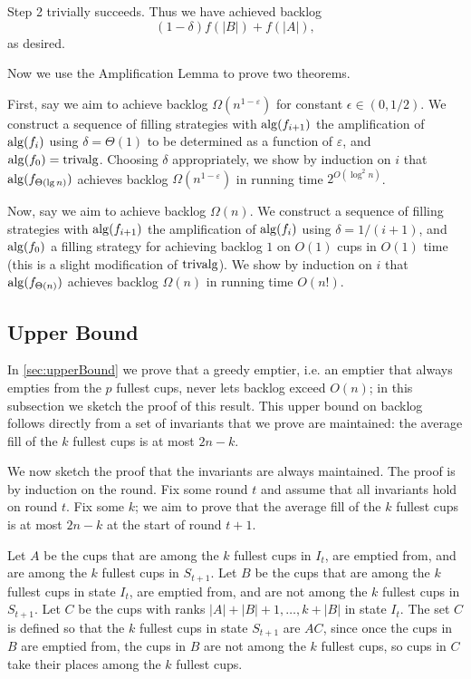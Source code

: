 Step 2 trivially succeeds.
Thus we have achieved backlog
$$(1-\delta) f(|B|) + f(|A|), $$
as desired.

Now we use the Amplification Lemma to prove two theorems.

First, say we aim to achieve backlog $\Omega(n^{1-\varepsilon})$
for constant $\epsilon \in (0, 1/2)$. We construct a sequence of
filling strategies with $\operatorname{\text{\textup{alg}}}(f_{i+1})$ the amplification of
$\operatorname{\text{\textup{alg}}}(f_i)$ using $\delta = \Theta(1)$ to be determined as a
function of $\varepsilon$, and $\operatorname{\text{\textup{alg}}}(f_0)=\operatorname{\text{\textup{trivalg}}}$.
Choosing $\delta$ appropriately, we show by induction on $i$ that
$\operatorname{\text{\textup{alg}}}(f_{\Theta(\lg n)})$ achieves backlog
$\Omega(n^{1-\varepsilon})$ in running time $2^{O(\log^2 n)}$.

Now, say we aim to achieve backlog $\Omega(n)$.
We construct a sequence of filling strategies with $\operatorname{\text{\textup{alg}}}(f_{i+1})$ the
amplification of $\operatorname{\text{\textup{alg}}}(f_i)$ using $\delta = 1/(i+1)$, and
$\operatorname{\text{\textup{alg}}}(f_0)$ a filling strategy for achieving backlog $1$ on
$O(1)$ cups in $O(1)$ time (this is a slight modification of
$\operatorname{\text{\textup{trivalg}}}$). We show by induction on $i$ that
$\operatorname{\text{\textup{alg}}}(f_{\Theta(n)})$ achieves backlog $\Omega(n)$ in running
time $O(n!)$.

\subsection{Upper Bound}
In \cref{sec:upperBound} we prove that a greedy emptier, i.e. an
emptier that always empties from the $p$ fullest cups, never lets
backlog exceed $O(n)$; in this subsection we sketch the proof of
this result.
This upper bound on backlog follows directly from a set of
invariants that we prove are maintained: the
average fill of the $k$ fullest cups is at most $2n-k$.

We now sketch the proof that the invariants are always
maintained. The proof is by induction on the round. Fix some
round $t$ and assume that all invariants hold on round $t$. Fix
some $k$; we aim to prove that the average fill of the $k$
fullest cups is at most $2n-k$ at the start of round $t+1$. 

Let $A$ be the cups that are among the $k$ fullest cups in $I_t$,
are emptied from, and are among the $k$ fullest cups in
$S_{t+1}$. Let $B$ be the cups that are among the $k$ fullest
cups in state $I_t$, are emptied from, and are not among the $k$
fullest cups in $S_{t+1}$. Let $C$ be the cups with ranks $|A| +
|B| + 1, \ldots, k + |B|$ in state $I_t$. The set $C$ is defined
so that the $k$ fullest cups in state $S_{t+1}$ are $AC$, since
once the cups in $B$ are emptied from, the cups in $B$ are not
among the $k$ fullest cups, so cups in $C$ take their places
among the $k$ fullest cups.

